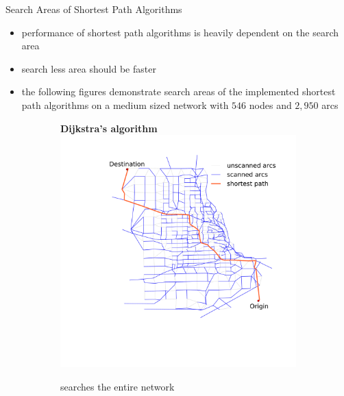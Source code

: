 \documentclass[final]{beamer}
\begin{document}
\begin{frame}{ }
\begin{columns}[t]
\begin{column}{.4\linewidth}
            \begin{block}{Search Areas of Shortest Path Algorithms}
                \begin{itemize}
                    \itemsep.5em
                    \item performance of shortest path algorithms is heavily dependent on the \alert{search area}
                    \item \alert{search less} area should be \alert{faster}
                    \item the following figures demonstrate search areas of the implemented shortest path algorithms on a \alert{medium sized} network with $546$ nodes and $2{,}950$ arcs
                \end{itemize}
                \vspace{1em}
                \begin{figure}
                    \centering
                    \begin{subfigure}{.5\linewidth}
                        \centering
                        {\bfseries Dijkstra's algorithm }
                        \includegraphics[width=\linewidth,trim=120px 280px 48px 60px,clip]{img/dijkstra}
                        \caption{searches the \alert{entire network}}
                    \end{subfigure}%
                    \begin{subfigure}{.5\linewidth}

\end{subfigure}
\end{figure}
\end{block}
\end{column}
\end{columns}
\end{frame}
\end{document}
